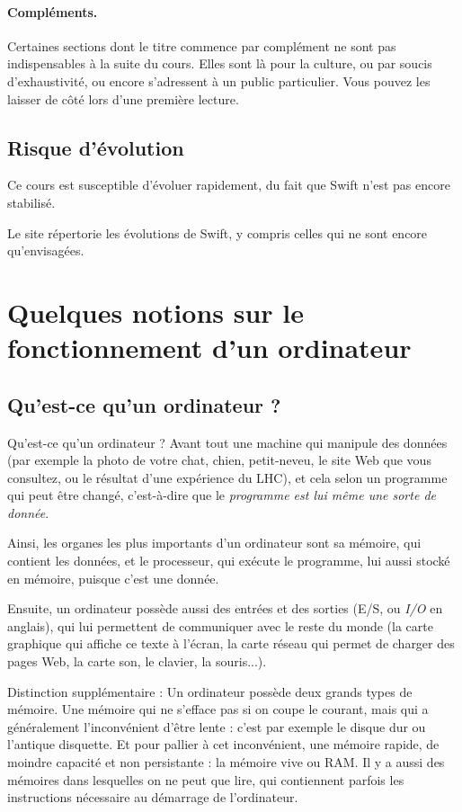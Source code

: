 \paragraph{Compléments.}
Certaines sections dont le titre commence par \og complément \fg{}
ne sont pas indispensables à la suite du cours.
Elles sont là pour la culture, ou par soucis d'exhaustivité,
ou encore s'adressent à un public particulier.
Vous pouvez les laisser de côté lors d'une première lecture.
\subsection{Risque d’évolution}
Ce cours est susceptible d'évoluer rapidement,
du fait que Swift n'est pas encore stabilisé.

Le site
répertorie les évolutions de Swift,
y compris celles qui ne sont encore qu'envisagées.
\section{Quelques notions sur le fonctionnement d'un ordinateur}
\subsection{Qu'est-ce qu'un ordinateur ?}
Qu'est-ce qu'un ordinateur ?
Avant tout une machine qui manipule des données
(par exemple la photo de votre chat, chien, petit-neveu,
le site Web que vous consultez, ou le résultat d'une expérience du LHC),
et cela selon un programme qui peut être changé,
c'est-à-dire que le \emph{programme est lui même une sorte de donnée}.

Ainsi, les organes les plus importants d'un ordinateur sont
sa mémoire, qui contient les données, et le processeur,
qui exécute le programme, lui aussi stocké en mémoire, puisque c'est une donnée.

Ensuite, un ordinateur possède aussi des entrées et des sorties (E/S, ou \emph{I/O} en anglais),
qui lui permettent de communiquer avec le reste du monde
(la carte graphique qui affiche ce texte à l'écran,
la carte réseau qui permet de charger des pages Web,
la carte son, le clavier, la souris...).

Distinction supplémentaire : Un ordinateur possède deux grands types de mémoire.
Une mémoire qui ne s'efface pas si on coupe le courant,
mais qui a généralement l'inconvénient d'être lente :
c'est par exemple le disque dur ou l'antique disquette.
Et pour pallier à cet inconvénient, une mémoire rapide,
de moindre capacité et non persistante : la mémoire vive ou RAM.
Il y a aussi des mémoires dans lesquelles on ne peut que lire, qui
contiennent parfois les instructions nécessaire au démarrage de l'ordinateur.
